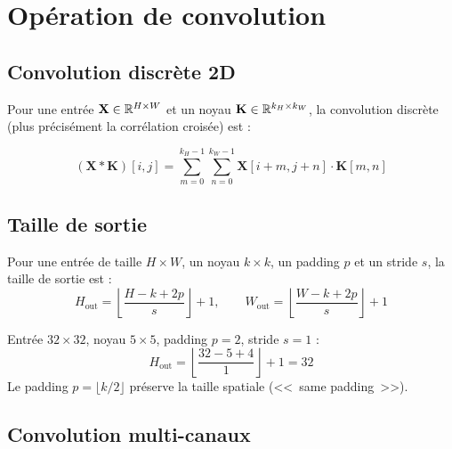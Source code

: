 \section{Op\'eration de convolution}
\label{sec:convolution}

\subsection{Convolution discr\`ete 2D}

Pour une entr\'ee $\mathbf{X} \in \mathbb{R}^{H \times W}$ et un noyau
$\mathbf{K} \in \mathbb{R}^{k_H \times k_W}$, la convolution discr\`ete
(plus pr\'ecis\'ement la corr\'elation crois\'ee) est :

\begin{formules}[title=\textbf{Convolution 2D}]
\begin{equation}
(\mathbf{X} * \mathbf{K})[i, j] = \sum_{m=0}^{k_H - 1} \sum_{n=0}^{k_W - 1}
  \mathbf{X}[i + m, j + n] \cdot \mathbf{K}[m, n]
\label{eq:conv2d}
\end{equation}
\end{formules}

\subsection{Taille de sortie}

\begin{theoreme}
Pour une entr\'ee de taille $H \times W$, un noyau $k \times k$, un padding
$p$ et un stride $s$, la taille de sortie est :
\begin{equation}
H_{\text{out}} = \left\lfloor \frac{H - k + 2p}{s} \right\rfloor + 1, \qquad
W_{\text{out}} = \left\lfloor \frac{W - k + 2p}{s} \right\rfloor + 1
\label{eq:conv-output-size}
\end{equation}
\end{theoreme}

\begin{exemple}
Entr\'ee $32 \times 32$, noyau $5 \times 5$, padding $p = 2$, stride $s = 1$ :
\[
H_{\text{out}} = \left\lfloor \frac{32 - 5 + 4}{1} \right\rfloor + 1 = 32
\]
Le padding $p = \lfloor k/2 \rfloor$ pr\'eserve la taille spatiale
(<<~same padding~>>).
\end{exemple}

\subsection{Convolution multi-canaux}

